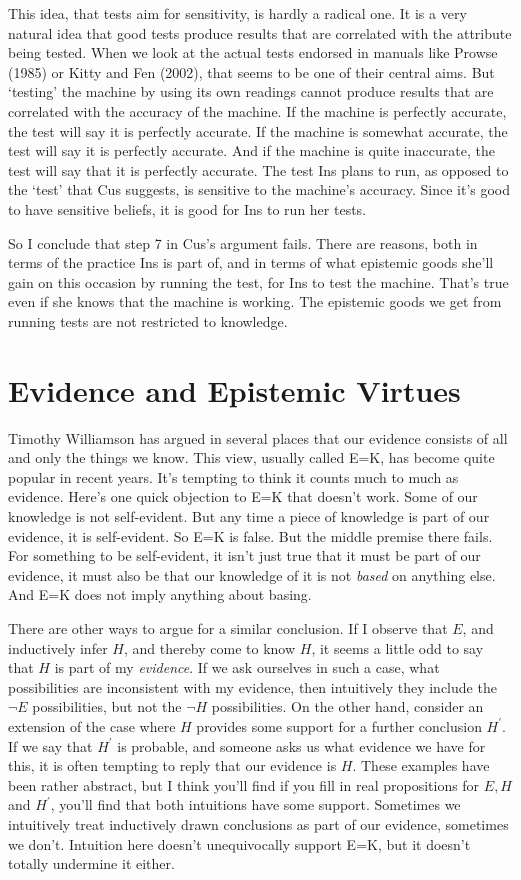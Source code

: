 This idea, that tests aim for sensitivity, is hardly a radical one. It is a very natural idea that good tests produce results that are correlated with the attribute being tested. When we look at the actual tests endorsed in manuals like Prowse (1985) or Kitty and Fen (2002), that seems to be one of their central aims. But `testing' the machine by using its own readings cannot produce results that are correlated with the accuracy of the machine. If the machine is perfectly accurate, the test will say it is perfectly accurate. If the machine is somewhat accurate, the test will say it is perfectly accurate. And if the machine is quite inaccurate, the test will say that it is perfectly accurate. The test Ins plans to run, as opposed to the `test' that Cus suggests, is sensitive to the machine's accuracy. Since it's good to have sensitive beliefs, it is good for Ins to run her tests.

So I conclude that step 7 in Cus's argument fails. There are reasons, both in terms of the practice Ins is part of, and in terms of what epistemic goods she'll gain on this occasion by running the test, for Ins to test the machine. That's true even if she knows that the machine is working. The epistemic goods we get from running tests are not restricted to knowledge.

\section{Evidence and Epistemic Virtues}
Timothy Williamson has argued in several places that our evidence consists of all and only the things we know. This view, usually called E=K, has become quite popular in recent years. It's tempting to think it counts much to much as evidence. Here's one quick objection to E=K that doesn't work. Some of our knowledge is not self-evident. But any time a piece of knowledge is part of our evidence, it is self-evident. So E=K is false. But the middle premise there fails. For something to be self-evident, it isn't just true that it must be part of our evidence, it must also be that our knowledge of it is not \textit{based} on anything else. And E=K does not imply anything about basing.

There are other ways to argue for a similar conclusion. If I observe that \(E\), and inductively infer \(H\), and thereby come to know \(H\), it seems a little odd to say that \(H\) is part of my \textit{evidence}. If we ask ourselves in such a case, what possibilities are inconsistent with my evidence, then intuitively they include the \(\neg E\) possibilities, but not the \(\neg H\) possibilities. On the other hand, consider an extension of the case where \(H\) provides some support for a further conclusion \(H^\prime\). If we say that \(H^\prime\) is probable, and someone asks us what evidence we have for this, it is often tempting to reply that our evidence is \(H\). These examples have been rather abstract, but I think you'll find if you fill in real propositions for \(E, H\) and \(H^\prime\), you'll find that both intuitions have some support. Sometimes we intuitively treat inductively drawn conclusions as part of our evidence, sometimes we don't. Intuition here doesn't unequivocally support E=K, but it doesn't totally undermine it either.

